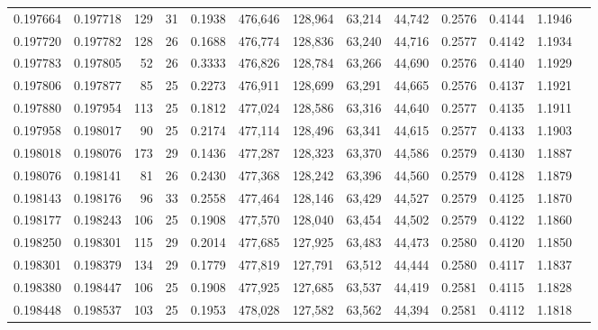 \begin{tabular}{rrrrrrrrrrrrr}
0.197664 & 0.197718 & 129 &  31 &                                     0.1938 & 476,646 & 128,964 &  63,214 &  44,742 & 0.2576 & 0.4144 & 1.1946 \\
0.197720 & 0.197782 & 128 &  26 &                                     0.1688 & 476,774 & 128,836 &  63,240 &  44,716 & 0.2577 & 0.4142 & 1.1934 \\
0.197783 & 0.197805 &  52 &  26 &                                     0.3333 & 476,826 & 128,784 &  63,266 &  44,690 & 0.2576 & 0.4140 & 1.1929 \\
0.197806 & 0.197877 &  85 &  25 &                                     0.2273 & 476,911 & 128,699 &  63,291 &  44,665 & 0.2576 & 0.4137 & 1.1921 \\
0.197880 & 0.197954 & 113 &  25 &                                     0.1812 & 477,024 & 128,586 &  63,316 &  44,640 & 0.2577 & 0.4135 & 1.1911 \\
0.197958 & 0.198017 &  90 &  25 &                                     0.2174 & 477,114 & 128,496 &  63,341 &  44,615 & 0.2577 & 0.4133 & 1.1903 \\
0.198018 & 0.198076 & 173 &  29 &                                     0.1436 & 477,287 & 128,323 &  63,370 &  44,586 & 0.2579 & 0.4130 & 1.1887 \\
0.198076 & 0.198141 &  81 &  26 &                                     0.2430 & 477,368 & 128,242 &  63,396 &  44,560 & 0.2579 & 0.4128 & 1.1879 \\
0.198143 & 0.198176 &  96 &  33 &                                     0.2558 & 477,464 & 128,146 &  63,429 &  44,527 & 0.2579 & 0.4125 & 1.1870 \\
0.198177 & 0.198243 & 106 &  25 &                                     0.1908 & 477,570 & 128,040 &  63,454 &  44,502 & 0.2579 & 0.4122 & 1.1860 \\
0.198250 & 0.198301 & 115 &  29 &                                     0.2014 & 477,685 & 127,925 &  63,483 &  44,473 & 0.2580 & 0.4120 & 1.1850 \\
0.198301 & 0.198379 & 134 &  29 &                                     0.1779 & 477,819 & 127,791 &  63,512 &  44,444 & 0.2580 & 0.4117 & 1.1837 \\
0.198380 & 0.198447 & 106 &  25 &                                     0.1908 & 477,925 & 127,685 &  63,537 &  44,419 & 0.2581 & 0.4115 & 1.1828 \\
0.198448 & 0.198537 & 103 &  25 &                                     0.1953 & 478,028 & 127,582 &  63,562 &  44,394 & 0.2581 & 0.4112 & 1.1818 \\

\end{tabular}
